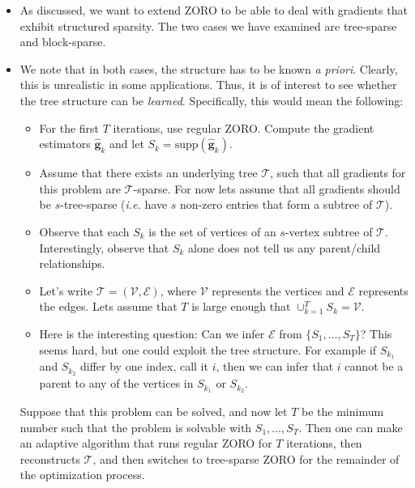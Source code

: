 \documentclass{article}
\begin{document}
\begin{itemize}
	\item As discussed, we want to extend ZORO to be able to deal with gradients that exhibit structured sparsity. The two cases we have examined are tree-sparse and block-sparse. \\
	\item We note that in both cases, the structure has to be known {\em a priori}. Clearly, this is unrealistic in some applications. Thus, it is of interest to see whether the tree structure can be {\em learned}. Specifically, this would mean the following:
	\begin{itemize}
		\item For the first $T$ iterations, use regular ZORO. Compute the gradient estimators $\hat{\mathbf{g}}_{k}$ and let $S_{k} = \text{supp}(\hat{\mathbf{g}}_k)$.
		\item Assume that there exists an underlying tree $\mathcal{T}$, such that all gradients for this problem are $\mathcal{T}$-sparse. For now lets assume that all gradients should be $s$-tree-sparse ({\em i.e.} have $s$ non-zero entries that form a subtree of $\mathcal{T}$).
		\item Observe that each $S_{k}$ is the set of vertices of an $s$-vertex subtree of $\mathcal{T}$. Interestingly, observe that $S_{k}$ alone does not tell us any parent/child relationships.
		\item Let's write $\mathcal{T} = (\mathcal{V},\mathcal{E})$, where $\mathcal{V}$ represents the vertices and $\mathcal{E}$ represents the edges. Lets assume that $T$ is large enough that $\cup_{k=1}^{T} S_k = \mathcal{V}$. 
		\item Here is the interesting question: Can we infer $\mathcal{E}$ from $\{S_1,\ldots, S_{T}\}$? This seems hard, but one could exploit the tree structure. For example if $S_{k_1}$ and $S_{k_2}$ differ by one index, call it $i$, then we can infer that $i$ cannot be a parent to any of the vertices in $S_{k_1}$ or $S_{k_2}$. 
	\end{itemize}
	Suppose that this problem can be solved, and now let $T$ be the minimum number such that the problem is solvable with $S_1,\ldots, S_{T}$. Then one can make an adaptive algorithm that runs regular ZORO for $T$ iterations, then reconstructs $\mathcal{T}$, and then switches to tree-sparse ZORO for the remainder of the optimization process.\\
	

\end{itemize}
\end{document}
